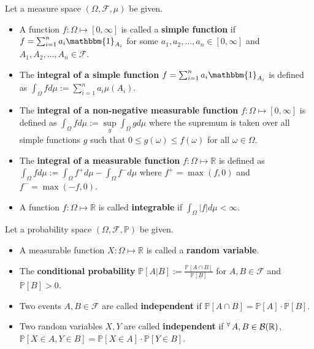 \documentclass[10pt]{article}
\theoremstyle{definition}
\newenvironment{definition*}[1]{%
  \IfBlankTF{#1}
    {\renewcommand{\themanualdefinitioninner}{\unskip}}
    {\renewcommand\themanualdefinitioninner{#1}}%
  \manualdefinitioninner
}{\endmanualdefinitioninner}
\begin{document}
\begin{definition*}{}Let a measure space $(\Omega, \mathcal{F}, \mu)$ be given.
    \leavevmode
    \begin{itemize}
        \item A function $f : \Omega \mapsto [0, \infty]$ is called a \textbf{simple function} if $f = \sum_{i=1}^{n} a_i \mathbbm{1}_{A_i}$ for some $a_1, a_2, \ldots, a_n \in [0, \infty]$ and $A_1, A_2, \ldots, A_n \in \mathcal{F}$.
        \item The \textbf{integral of a simple function} $f = \sum_{i=1}^{n} a_i \mathbbm{1}_{A_i}$ is defined as $\int_{\Omega} f d\mu := \sum_{i=1}^{n} a_i \mu(A_i)$.
        \item The \textbf{integral of a non-negative measurable function} $f : \Omega \mapsto [0, \infty]$ is defined as $\int_{\Omega} f d\mu := \sup\limits_{g} \int_{\Omega} g d\mu$ where the supremum is taken over all simple functions $g$ such that $0 \leq g(\omega) \leq f(\omega)$ for all $\omega \in \Omega$.
        \item The \textbf{integral of a measurable function} $f : \Omega \mapsto \mathbb{R}$ is defined as $\int_{\Omega} f d\mu := \int_{\Omega} f^+ d\mu - \int_{\Omega} f^- d\mu$ where $f^+ = \max(f, 0)$ and $f^- = \max(-f, 0)$.
        \item A function $f : \Omega \mapsto \mathbb{R}$ is called \textbf{integrable} if $\int_{\Omega} |f| d\mu < \infty$.
    \end{itemize}
\end{definition*}

\begin{definition*}{}Let a probability space $(\Omega, \mathcal{F}, \mathbb{P})$ be given.
    \leavevmode
    \begin{itemize}
        \item A measurable function $X : \Omega \mapsto \mathbb{R}$ is called a \textbf{random variable}.
        \item The \textbf{conditional probability} $\mathbb{P}[A|B] := \frac{\mathbb{P}[A \cap B]}{\mathbb{P}[B]}$ for $A, B \in \mathcal{F}$ and $\mathbb{P}[B] > 0$.
        \item Two events $A, B \in \mathcal{F}$ are called \textbf{independent} if $\mathbb{P}[A \cap B] = \mathbb{P}[A] \cdot \mathbb{P}[B]$.
        \item Two random variables $X, Y$ are called \textbf{independent} if $^\forall \hspace{0.1em} A, B \in \mathcal{B}(\mathbb{R})$, $\mathbb{P}[X \in A, Y \in B] = \mathbb{P}[X \in A] \cdot \mathbb{P}[Y \in B]$.
    \end{itemize}
\end{definition*}
\end{document}
